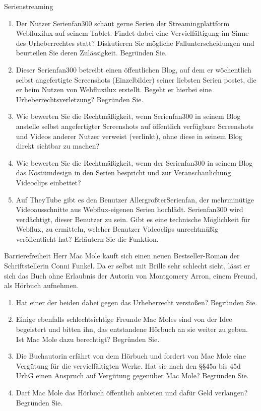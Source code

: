 \documentclass{article}
\begin{document}
\begin{exercise}{Serienstreaming}
  \begin{enumerate}
    \item Der Nutzer Serienfan300 schaut gerne Serien der Streamingplattform Webfluxilux auf seinem Tablet. Findet dabei eine Vervielfältigung im Sinne des Urheberrechtes statt? Diskutieren Sie mögliche Fallunterscheidungen und beurteilen Sie deren Zulässigkeit. Begründen Sie.
    \item Dieser Serienfan300 betreibt einen öffentlichen Blog, auf dem er wöchentlich selbst angefertigte Screenshots (Einzelbilder) seiner liebsten Serien postet, die er beim Nutzen von Webfluxilux erstellt. Begeht er hierbei eine Urheberrechtsverletzung? Begründen Sie.
    \item Wie bewerten Sie die Rechtmäßigkeit, wenn Serienfan300 in seinem Blog anstelle selbst angefertigter Screenshots auf öffentlich verfügbare Screenshots und Videos anderer Nutzer verweist (verlinkt), ohne diese in seinem Blog direkt sichtbar zu machen?
    \item Wie bewerten Sie die Rechtmäßigkeit, wenn der Serienfan300 in seinem Blog das Kostümdesign in den Serien bespricht und zur Veranschaulichung Videoclips einbettet?
    \item Auf TheyTube gibt es den Benutzer AllergroßterSerienfan, der mehrminütige Videoausschnitte aus Webflux-eigenen Serien hochlädt. Serienfan300 wird verdächtigt, dieser Benutzer zu sein. Gibt es eine technische Möglichkeit für Webflux, zu ermitteln, welcher Benutzer Videoclips unrechtmäßig veröffentlicht hat? Erläutern Sie die Funktion.
  \end{enumerate}
\end{exercise}

\begin{exercise}{Barrierefreiheit}
  Herr Mac Mole kauft sich einen neuen Bestseller-Roman der Schriftstellerin Conni Funkel. Da er selbst mit Brille sehr schlecht sieht, lässt er sich das Buch ohne Erlaubnis der Autorin von Montgomery Arron, einem Freund, als Hörbuch aufnehmen.
  \begin{enumerate}
    \item Hat einer der beiden dabei gegen das Urheberrecht verstoßen? Begründen Sie.
    \item Einige ebenfalls schlechtsichtige Freunde Mac Moles sind von der Idee begeistert und bitten ihn, das entstandene Hörbuch an sie weiter zu geben. Ist Mac Mole dazu berechtigt? Begründen Sie.
    \item Die Buchautorin erfährt von dem Hörbuch und fordert von Mac Mole eine Vergütung für die vervielfältigten Werke. Hat sie nach den §§45a bis 45d UrhG einen Anspruch auf Vergütung gegenüber Mac Mole? Begründen Sie.
    \item Darf Mac Mole das Hörbuch öffentlich anbieten und dafür Geld verlangen? Begründen Sie.
  \end{enumerate}
\end{exercise}
\end{document}
